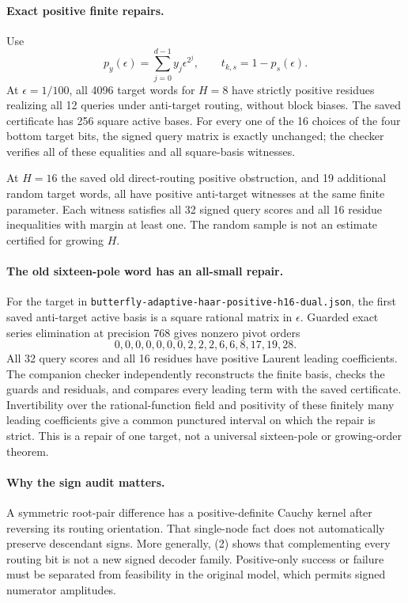 \documentclass[11pt]{article}
\begin{document}
\paragraph{Exact positive finite repairs.}
Use
\[
 p_y(\epsilon)=\sum_{j=0}^{d-1}y_j\epsilon^{2^j},
 \qquad t_{k,s}=1-p_s(\epsilon).
\]
At $\epsilon=1/100$, all 4096 target words for $H=8$ have strictly
positive residues realizing all 12 queries under anti-target routing,
without block biases. The saved certificate has 256 square active
bases. For every one of the 16 choices of the four bottom target bits,
the signed query matrix is exactly unchanged; the checker verifies
all of these equalities and all square-basis witnesses.

At $H=16$ the saved old direct-routing positive obstruction, and 19
additional random target words, all have positive anti-target witnesses
at the same finite parameter. Each witness satisfies all 32 signed
query scores and all 16 residue inequalities with margin at least one.
The random sample is not an estimate certified for growing $H$.

\paragraph{The old sixteen-pole word has an all-small repair.}
For the target in
\texttt{butterfly-adaptive-haar-positive-h16-dual.json}, the first
saved anti-target active basis is a square rational matrix in
$\epsilon$. Guarded exact series elimination at precision 768 gives
nonzero pivot orders
\[
 0,0,0,0,0,0,0,2,2,2,6,6,8,17,19,28.
\]
All 32 query scores and all 16 residues have positive Laurent leading
coefficients. The companion checker independently reconstructs the
finite basis, checks the guards and residuals, and compares every
leading term with the saved certificate. Invertibility over the
rational-function field and positivity of these finitely many leading
coefficients give a common punctured interval on which the repair is
strict. This is a repair of one target, not a universal sixteen-pole
or growing-order theorem.

\paragraph{Why the sign audit matters.}
A symmetric root-pair difference has a positive-definite Cauchy
kernel after reversing its routing orientation. That single-node fact
does not automatically preserve descendant signs. More generally,
(2) shows that complementing every routing bit is not a new signed
decoder family. Positive-only success or failure must be separated
from feasibility in the original model, which permits signed
numerator amplitudes.
\end{document}
